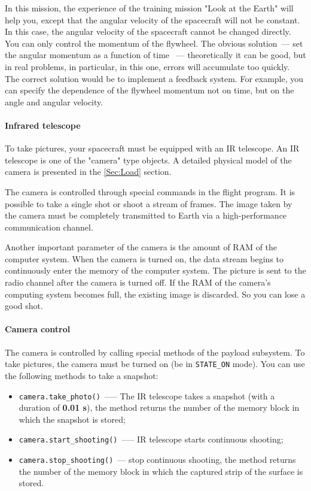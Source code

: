 \documentclass[12pt,a4paper]{article}
\begin{document}
In this mission, the experience of the training mission "Look at the Earth" will help you, except that the angular velocity of the spacecraft will not be constant. In this case, the angular velocity of the spacecraft cannot be changed directly. You can only control the momentum of the flywheel. The obvious solution~--- set the angular momentum as a function of time ~--- theoretically it can be good, but in real problems, in particular, in this one, errors will accumulate too quickly. The correct solution would be to implement a feedback system. For example, you can specify the dependence of the flywheel momentum not on time, but on the angle and angular velocity.

\paragraph{Infrared telescope}

To take pictures, your spacecraft must be equipped with an IR telescope. An IR telescope is one of the "camera" type objects. A detailed physical model of the camera is presented in the \ref{Sec:Load} section.

The camera is controlled through special commands in the flight program. It is possible to take a single shot or shoot a stream of frames. The image taken by the camera must be completely transmitted to Earth via a high-performance communication channel.

Another important parameter of the camera is the amount of RAM of the computer system. When the camera is turned on, the data stream begins to continuously enter the memory of the computer system. The picture is sent to the radio channel after the camera is turned off. If the RAM of the camera's computing system becomes full, the existing image is discarded. So you can lose a good shot.

\paragraph{Camera control}

The camera is controlled by calling special methods of the payload subsystem. To take pictures, the camera must be turned on (be in \verb'STATE_ON' mode). You can use the following methods to take a snapshot:

\begin{itemize}
\item \verb'camera.take_photo()'~--— The IR telescope takes a snapshot (with a duration of \textbf{0.01 s}), the method returns the number of the memory block in which the snapshot is stored;
\item \verb'camera.start_shooting()'~--— IR telescope starts continuous shooting;
\item \verb'camera.stop_shooting()'~--- stop continuous shooting, the method returns the number of the memory block in which the captured strip of the surface is stored.
\end{itemize}
\end{document}
